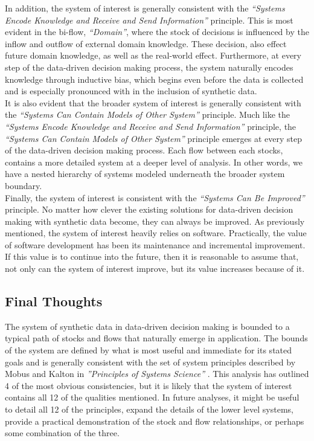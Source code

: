 \documentclass{article}
\begin{document}
In addition, the system of interest is generally consistent with the \textit{``Systems Encode Knowledge and Receive and Send Information''} principle. This is most evident in the bi-flow, \textit{``Domain''}, where the stock of decisions is influenced by the inflow and outflow of external domain knowledge. These decision, also effect future domain knowledge, as well as the real-world effect. Furthermore, at every step of the data-driven decision making process, the system naturally encodes knowledge through inductive bias, which begins even before the data is collected and is especially pronounced with in the inclusion of synthetic data. \\

It is also evident that the broader system of interest is generally consistent with the \textit{``Systems Can Contain Models of Other System''} principle. Much like the \textit{``Systems Encode Knowledge and Receive and Send Information''} principle, the \textit{``Systems Can Contain Models of Other System''} principle emerges at every step of the data-driven decision making process. Each flow between each stocks, contains a more detailed system at a deeper level of analysis. In other words, we have a nested hierarchy of systems modeled underneath the broader system boundary. \\ 

\newpage
Finally, the system of interest is consistent with the \textit{``Systems Can Be Improved''} principle. No matter how clever the existing solutions for data-driven decision making with synthetic data become, they can always be improved. As previously mentioned, the system of interest heavily relies on software. Practically, the value of software development has been its maintenance and incremental improvement. If this value is to continue into the future, then it is reasonable to assume that, not only can the system of interest improve, but its value increases because of it. \\

\subsection*{Final Thoughts}
The system of synthetic data in data-driven decision making is bounded to a typical path of stocks and flows that naturally emerge in application. The bounds of the system are defined by what is most useful and immediate for its stated goals and is generally consistent with the set of system principles described by Mobus and Kalton in \textit{''Principles of Systems Science''} \cite{mobus}. This analysis has outlined 4 of the most obvious consistencies, but it is likely that the system of interest contains all 12 of the qualities mentioned. In future analyses, it might be useful to detail all 12 of the principles, expand the details of the lower level systems, provide a practical demonstration of the stock and flow relationships, or perhaps some combination of the three. 

\newpage


\end{document}
